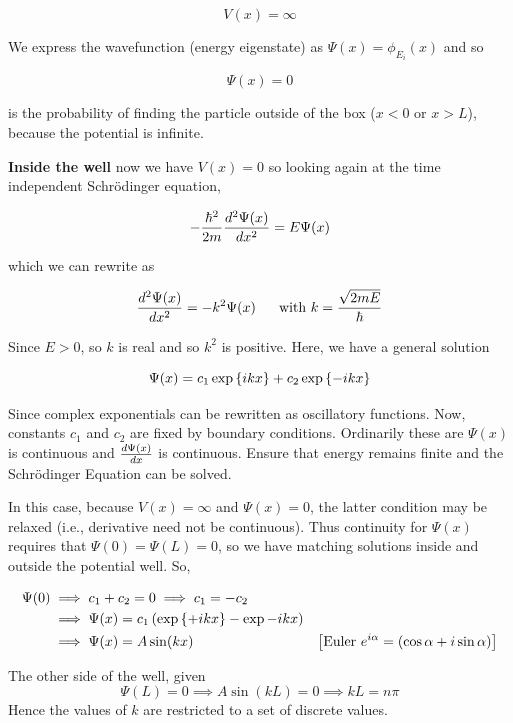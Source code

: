 \documentclass[english, 11pt]{article}
\begin{document}
\begin{itemize}
        \[ V(x) = \infty \]

        We express the wavefunction (energy eigenstate) as $\Psi(x) = \phi_{E_i}(x)$ and so

        \[ \Psi(x) = 0 \]

        is the probability of finding the particle outside of the box ($x < 0$ or $x > L$), because the potential is infinite.

        \textbf{Inside the well} now we have $V(x) = 0$ so looking again at the time independent Schrödinger equation,

        \[ -\frac{\hbar^2}{2m}\frac{d^2\Psi(x)}{dx^2} = E\Psi(x) \]

        which we can rewrite as

        \[ \f{d^2\Psi(x)}{dx^2} = -k^2\Psi(x) \ \ \ \ \ \mbox{with } k = \f{\sqrt{2mE}}{\hbar} \]

        Since $E>0$, so $k$ is real and so $k^2$ is positive. Here, we have a general solution

        \[ \Psi(x) = c_1 \exp \left\{ ikx \right\} + c_2\exp \left\{ -ikx \right\} \]

        Since complex exponentials can be rewritten as oscillatory functions. Now, constants $c_1$ and $c_2$ are fixed by boundary conditions. Ordinarily these are $\Psi(x)$ is continuous and $\frac{d\Psi(x)}{dx}$ is continuous. Ensure that energy remains finite and the Schrödinger Equation can be solved.
        \newline

        In this case, because $V(x) = \infty$ and $\Psi(x) = 0$, the latter condition may be relaxed (i.e., derivative need not be continuous). Thus continuity for $\Psi(x)$ requires that $\Psi(0) = \Psi(L) = 0$, so we have matching solutions inside and outside the potential well. So,

        \begin{align*}
          \Psi(0) & \implies c_1 + c_2 = 0 \implies c_1 = - c_2 \\
          & \implies \Psi(x) = c_1 \left( \exp \left\{ +ikx \right\} - \exp{-ikx} \right) \\
          & \implies \Psi(x) = A\sin(kx) & \left[ \mbox{Euler } e^{i\alpha} = \left( \cos\alpha + i\sin\alpha \right)\right]
        \end{align*}

        The other side of the well, given
        \[ \Psi(L) = 0 \implies A\sin(kL) = 0 \implies kL=n\pi \]
        Hence the values of $k$ are restricted to a set of discrete values.


\end{itemize}
\end{document}
